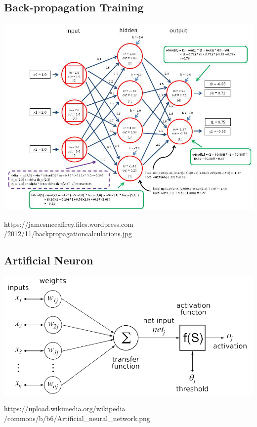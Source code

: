 \documentclass[a0,portrait,25pt]{sciposter}
\begin{document}
\begin{multicols}{3}

\begin{mdframed}[backgroundcolor=white,roundcorner=4pt,shadow=true,linewidth=1pt]
\color{Black}
\section*{Back-propagation Training}
\begin{minipage}[c]{1\linewidth}
\includegraphics[width=0.9\linewidth]{fig01}
\end{minipage}
https://jamesmccaffrey.files.wordpress.com\\/2012/11/backpropagationcalculations.jpg
\end{mdframed}

\begin{mdframed}[backgroundcolor=white,roundcorner=4pt,shadow=true,linewidth=1pt]
\color{Black}
\section*{Artificial Neuron}
\begin{minipage}[c]{1\linewidth}
\includegraphics[width=0.9\linewidth]{fig03}
\end{minipage}
https://upload.wikimedia.org/wikipedia\\/commons/b/b6/Artificial\_neural\_network.png
\end{mdframed}


\end{multicols}
\end{document}
